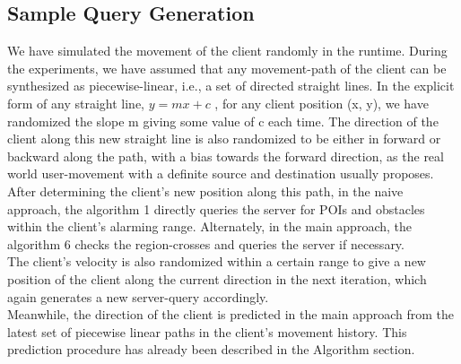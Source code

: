 \subsection{Sample Query Generation}
We have simulated the movement of the client randomly in the runtime. During the experiments, we have assumed that any movement-path of the client can be synthesized as piecewise-linear, i.e., a set of directed straight lines. In the explicit form of any straight line, $ y=mx+c$ , for any client position (x, y), we have randomized the slope m giving some value of c each time. The direction of the client along this new straight line is also randomized to be either in forward or backward along the path, with a bias towards the forward direction, as the real world user-movement with a definite source and destination usually proposes.\\
After determining the client’s new position along this path, in the naive approach, the algorithm 1 directly queries the server for POIs and obstacles within the client’s alarming range. Alternately, in the main approach, the algorithm 6 checks the region-crosses and queries the server if necessary.\\
The client’s velocity is also randomized within a certain range to give a new position of the client along the current direction in the next iteration, which again generates a new server-query accordingly.\\
Meanwhile, the direction of the client is predicted in the main approach from the latest set of piecewise linear paths in the client’s movement history. This prediction procedure has already been described in the  Algorithm section.\\


